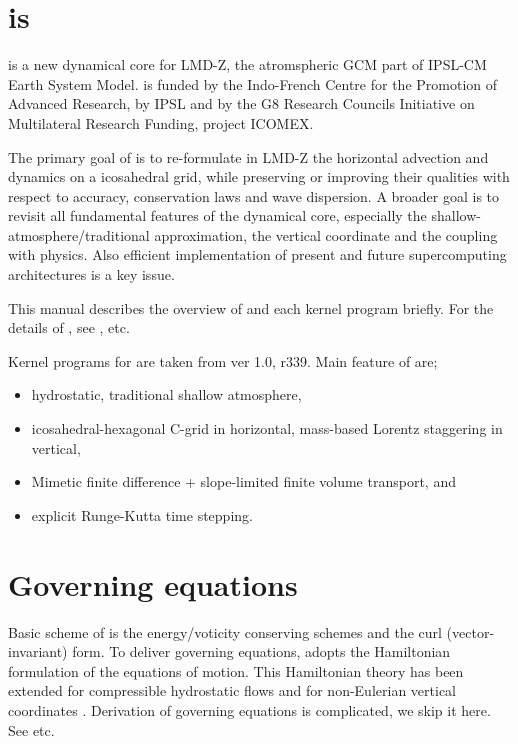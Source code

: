\section{\DYNAMICO is}

\DYNAMICO \footnotemark is a new dynamical core for LMD-Z, the atromspheric GCM part
of IPSL-CM Earth System Model.
%
\DYNAMICO is funded by the Indo-French Centre for the Promotion of
Advanced Research, by IPSL and by the G8 Research Councils Initiative on
Multilateral Research Funding, project ICOMEX.





The primary goal of \DYNAMICO is to re-formulate in LMD-Z the horizontal
advection and dynamics on a icosahedral grid, while preserving or
improving their qualities with respect to accuracy, conservation laws
and wave dispersion.
%
A broader goal is to revisit all fundamental features of the dynamical
core, especially the shallow-atmosphere/traditional approximation, the
vertical coordinate and the coupling with physics.
%
Also efficient implementation of present and future supercomputing
architectures is a key issue.

This manual describes the overview of \DYNAMICO and each kernel program
briefly.
%
For the details of \DYNAMICO, see
\cite{gmd-8-3131-2015},
etc.


Kernel programs for \DYNAMICO are taken from \DYNAMICO ver 1.0, r339.
%
Main feature of  are;
\begin{itemize}
 \item hydrostatic, traditional shallow atmosphere,
 \item icosahedral-hexagonal C-grid in horizontal, mass-based Lorentz
       staggering in vertical,
 \item Mimetic finite difference + slope-limited finite volume
       transport, and
 \item explicit Runge-Kutta time stepping.
\end{itemize}



\section{Governing equations}

Basic scheme of \DYNAMICO is the energy/voticity conserving schemes and
the curl (vector-invariant) form.
%
To deliver governing equations, \DYNAMICO adopts the Hamiltonian
formulation of the equations of motion.
%
This Hamiltonian theory has been extended for compressible hydrostatic
flows and for non-Eulerian vertical coordinates \citep{JAS-D-13-0339,MWR-D-14-00069}.
%
Derivation of governing equations is complicated, we skip it here. See
\cite{gmd-8-3131-2015} etc.




